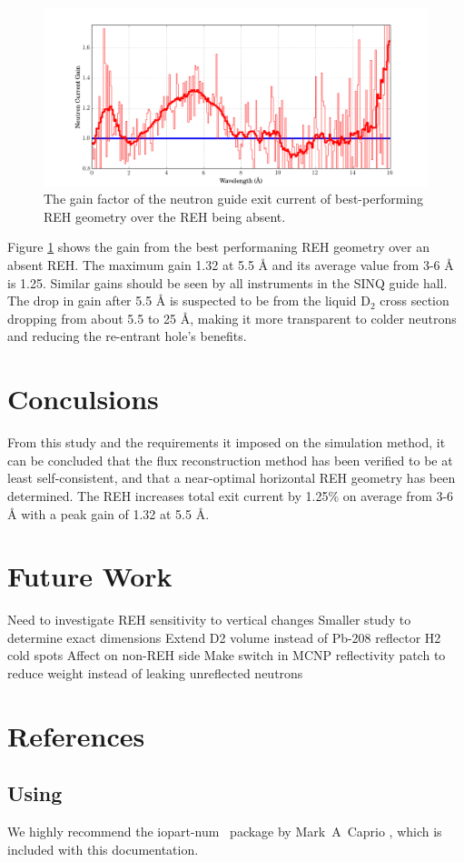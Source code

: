 \documentclass[a4paper]{jpconf}
\begin{document}
\begin{figure}
\begin{center}
\includegraphics[scale=0.38,trim={0cm 0cm 0cm 0cm},clip]{graphics/parametric_gain.pdf}
\end{center}
\caption{\label{parametric_gain}The gain factor of the neutron guide exit current of best-performing REH geometry over the REH being absent.}
\end{figure}


Figure \ref{parametric_gain} shows the gain from the best performaning REH geometry over an absent REH.  The maximum gain 1.32 at 5.5 \AA{} and its average value from 3-6 \AA{} is 1.25.  Similar gains should be seen by all instruments in the SINQ guide hall.  The drop in gain after 5.5 \AA{} is suspected to be from the liquid D$_2$ cross section dropping from about 5.5 to 25 \AA{}, making it more transparent to colder neutrons and reducing the re-entrant hole's benefits.


\section{Conculsions}

From this study and the requirements it imposed on the simulation method, it can be concluded that the flux reconstruction method has been verified to be at least self-consistent, and that a near-optimal horizontal REH geometry has been determined.  The REH increases total exit current by 1.25\% on average from 3-6 \AA{} with a peak gain of 1.32 at 5.5 \AA{}.

\section{Future Work}

Need to investigate REH sensitivity to vertical changes
Smaller study to determine exact dimensions
Extend D2 volume instead of Pb-208 reflector
H2 cold spots
Affect on non-REH side
Make switch in MCNP reflectivity patch to reduce weight instead of leaking unreflected neutrons


\section{References}

\subsection{Using \BibTeX}
We highly recommend the {\ttfamily\textbf\selectfont iopart-num} \BibTeX\ package by Mark~A~Caprio \cite{iopartnum}, which is included with this documentation.
\end{document}
